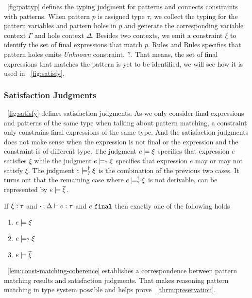 \documentclass[runningheads,envcountsame,a4paper]{llncs}
\begin{document}
\figurename~\ref{fig:pattyp} defines the typing judgment for patterns and
connects constraints with patterns. When pattern $p$ is assigned type $\tau$,
we collect the typing for the pattern variables and pattern holes in $p$ and
generate the corresponding variable context $\Gamma$ and hole context $\Delta$.
Besides two contexts, we emit a constraint $\xi$ to identify the set of final
expressions that match $p$. Rules \PTEHole and Rules \PTHole specifies that
pattern holes emits \textit{Unknown} constraint, $\mathtt{?}$. That means, the
set of final expressions that matches the pattern is yet to be identified, we
will see how it is used in \figurename~\ref{fig:satisfy}.

\subsubsection{Satisfaction Judgments}


\figurename~\ref{fig:satisfy} defines satisfaction judgments. As we only
consider final expressions and patterns of the same type when talking about
pattern matching, a constraint only constrains final expressions of the same
type. And the satisfaction judgments does not make sense when the expression is
not final or the expression and the constraint is of different type. The
judgment $e \models \xi$ specifies that expression $e$ satisfies $\xi$ while
the judgment $e \models_{?} \xi$ specifies that expression $e$ may or may not
satisfy $\xi$. The judgment $e \models_{?}^{\dag} \xi$ is the combination of the
previous two cases. It turns out that the remaining case where
$e \models_{?}^{\dag} \xi$ is not derivable, can be represented by
$e \models \overline{\xi}$.

\begin{theorem}
  \label{thrm:exclusive-constraint-satisfaction}
  If $\xi : \tau$ and $\cdot \mathbin{;} \Delta \vdash e : \tau$ and $e ~\mathtt{final}$ then exactly one of the following holds
  \begin{enumerate}
  \item $e \models \xi$
  \item $e \models_{?} \xi$
  \item $e \models \overline{\xi}$
  \end{enumerate}
\end{theorem}

\lemmaname~\ref{lem:const-matching-coherence} establishes a correspondence
between pattern matching results and satisfaction judgments. That makes
reasoning pattern matching in type system possible and helps prove
\theoremname~\ref{thrm:preservation}.
\end{document}
